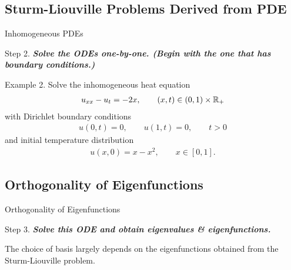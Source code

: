 \documentclass[hyperref={pdfpagelabels=true}]{beamer}
\newcommand{\highlightg}[1]{\textcolor[rgb]{0.1,0.5,0.3}{\emph{\textbf{#1}}}}
\newcommand{\structb}[1]{\textcolor[rgb]{0.2,0.2,0.7}{#1}}
\begin{document}
\subsection{Sturm-Liouville Problems Derived from PDE}


\begin{frame}{Inhomogeneous PDEs}

\justifying
\begin{block}{}
	\justifying
	\structb{Step 2.} \highlightg{Solve the ODEs one-by-one. (Begin with the one that has boundary conditions.)} 
\end{block}

\begin{block}{}
	\structb{Example 2.} Solve the inhomogeneous heat equation
	\begin{align*}
	u_{xx} - u_t = -2x, \qquad (x, t)\in (0, 1)\times \mathbb{R}_{+}
	\end{align*}
	with Dirichlet boundary conditions
	\begin{align*}
	u(0, t) = 0, \qquad u(1, t) = 0, \qquad t > 0
	\end{align*}
	and initial temperature distribution
	\begin{align*}
	u(x, 0) = x - x^2, \qquad x\in [0, 1].
	\end{align*}
	
\end{block}

\end{frame}




\subsection{Orthogonality of Eigenfunctions}



\begin{frame}{Orthogonality of Eigenfunctions}

\begin{block}{}
	\justifying
	\structb{Step 3.} \highlightg{Solve this ODE and obtain eigenvalues \& eigenfunctions.}
\end{block}
\begin{block}{}
	\justifying
	The choice of basis largely depends on the eigenfunctions obtained from the Sturm-Liouville problem.
\end{block}


\end{frame}
\end{document}

